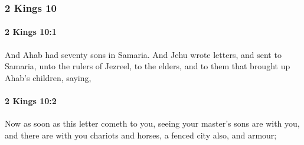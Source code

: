 	\subsubsection{2 Kings 10} %
		\label{2KINGS-10}

		\paragraph{2 Kings 10:1} %
			\label{2KINGS-10-1}

			And Ahab had seventy sons in Samaria. And Jehu wrote letters, and sent to Samaria, unto the rulers of Jezreel, to the elders, and to them that brought up Ahab’s children, saying,


		\paragraph{2 Kings 10:2} %
			\label{2KINGS-10-2}

			Now as soon as this letter cometh to you, seeing your master’s sons are with you, and there are with you chariots and horses, a fenced city also, and armour;

